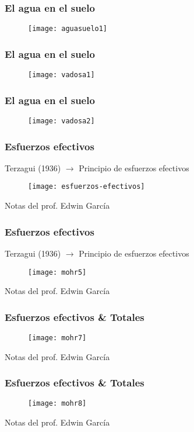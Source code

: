 \documentclass[12pt]{beamer}
\begin{document}
\begin{frame}
\frametitle{El agua en el suelo}
\begin{figure}
\centering
\texttt{[image: aguasuelo1]}
\end{figure}
\end{frame}
\begin{frame}
\frametitle{El agua en el suelo}
\begin{figure}
\centering
\texttt{[image: vadosa1]}
\end{figure}
\end{frame}
\begin{frame}
\frametitle{El agua en el suelo}
\begin{figure}
\centering
\texttt{[image: vadosa2]}
\end{figure}
\end{frame}
\begin{frame}
\frametitle{Esfuerzos efectivos}
\scriptsize{Terzagui (1936) $\rightarrow$ Principio de esfuerzos efectivos}
\begin{figure}
\centering
\texttt{[image: esfuerzos-efectivos]}
\end{figure}
\tiny{Notas del prof. Edwin García}
\end{frame}
\begin{frame}
\frametitle{Esfuerzos efectivos}
\scriptsize{Terzagui (1936) $\rightarrow$ Principio de esfuerzos efectivos}
\begin{figure}
\centering
\texttt{[image: mohr5]}
\end{figure}
\tiny{Notas del prof. Edwin García}
\end{frame}
\begin{frame}
\frametitle{Esfuerzos efectivos \& Totales}
\begin{figure}
\centering
\texttt{[image: mohr7]}
\end{figure}
\tiny{Notas del prof. Edwin García}
\end{frame}
\begin{frame}
\frametitle{Esfuerzos efectivos \& Totales}
\begin{figure}
\centering
\texttt{[image: mohr8]}
\end{figure}
\tiny{Notas del prof. Edwin García}
\end{frame}
\end{document}
